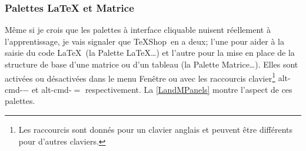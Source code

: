 \documentclass[11pt,french]{article}
\newcommand{\TS}{\textsf{\TeX Shop}}
\newcommand{\cmd}[1]{\textsf{#1}}
\newcommand{\mnu}[1]{\textsf{#1}}
\begin{document}
\subsubsection{Palettes LaTeX et Matrice}

Même si je crois que les palettes à interface cliquable nuisent réellement à l'apprentissage, je vais signaler que \TS\ en a deux; l'une pour aider à la saisie du code \LaTeX\ (la \mnu{Palette LaTeX…}) et l'autre pour la mise en place de la structure de base d'une matrice ou d'un tableau (la \mnu{Palette Matrice…}). Elles sont activées ou désactivées dans le menu \mnu{Fenêtre} ou avec les raccourcis clavier\footnote{Les raccourcis sont donnés pour un clavier anglais et peuvent être différents pour d'autres claviers.} \cmd{alt-cmd-{}$-$} et \cmd{alt-cmd-$=$} respectivement. La \vref{LandMPanels} montre l'aspect de ces palettes.
\end{document}
